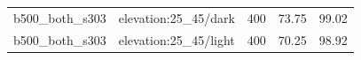 \begin{longtable}{l>{\raggedright\arraybackslash}p{.42\linewidth}rrr}
b500\_\allowbreak{}both\_\allowbreak{}s303 & %
elevation:25\_\allowbreak{}45/dark & %
400 & %
73.75 & %
99.02 \\ %

b500\_\allowbreak{}both\_\allowbreak{}s303 & %
elevation:25\_\allowbreak{}45/light & %
400 & %
70.25 & %
98.92 \\ %


\end{longtable}
